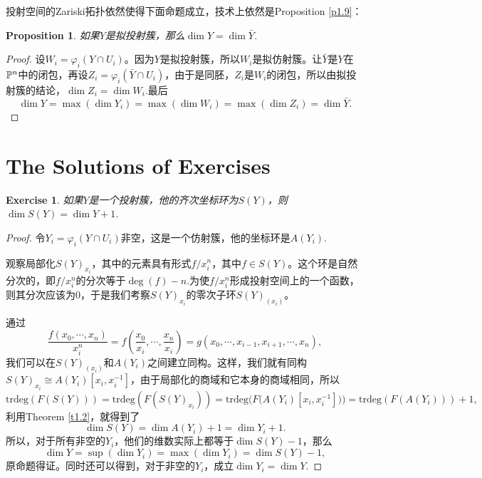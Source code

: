 \documentclass[9pt]{extbook}
\theoremstyle{plain}%
\newtheorem{pro}[defi]{Proposition}%
\newtheorem{exe}{Exercise}[section]%
\begin{document}
投射空间的Zariski拓扑依然使得下面命题成立，技术上依然是Proposition \ref{p1.9}：
\begin{pro}如果$Y$是拟投射簇，那么$\dim Y=\dim \bar{Y}$.\end{pro}
\begin{proof}
设$W_i=\varphi_i(Y\cap U_i)$。因为$Y$是拟投射簇，所以$W_i$是拟仿射簇。让$\bar{Y}$是$Y$在$\mathbb{P}^n$中的闭包，再设$Z_i=\varphi_i(\bar{Y}\cap U_i)$，由于是同胚，$Z_i$是$W_i$的闭包，所以由拟投射簇的结论，$\dim Z_i=\dim W_i$.最后
\[
	\dim Y=\max(\dim Y_i)=\max(\dim W_i)=\max(\dim Z_i)=\dim \bar{Y}.
\]
\end{proof}

\section*{The Solutions of Exercises}
\setcounter{exe}{5}
\begin{exe}
	如果$Y$是一个投射簇，他的齐次坐标环为$S(Y)$，则$\dim S(Y)=\dim Y+1$.
	\label{c2:e6}
\end{exe}
\begin{proof}
	令$Y_i=\varphi_i(Y\cap U_i)$非空，这是一个仿射簇，他的坐标环是$A(Y_i)$.

	观察局部化$S(Y)_{x_i}$，其中的元素具有形式$f/x_i^n$，其中$f\in S(Y)$。这个环是自然分次的，即$f/x_i^n$的分次等于$\deg(f)-n$.为使$f/x_i^n$形成投射空间上的一个函数，则其分次应该为$0$，于是我们考察$S(Y)_{x_i}$的零次子环$S(Y)_{(x_i)}$。

	通过
	\[
		\frac{f(x_0,\cdots,x_n)}{x_i^n}=f\left(\frac{x_0}{x_i},\cdots,\frac{x_n}{x_i}\right)=g(x_0,\cdots,x_{i-1},x_{i+1},\cdots,x_n),
	\]
	我们可以在$S(Y)_{(x_i)}$和$A(Y_i)$之间建立同构。这样，我们就有同构$S(Y)_{x_i}\cong A(Y_i)[x_i,x_i^{-1}]$，由于局部化的商域和它本身的商域相同，所以
	\[
	\mathrm{trdeg}(F(S(Y)))=\mathrm{trdeg}(F(S(Y)_{x_i}))=\mathrm{trdeg}\bigl(F\bigl(A(Y_i)[x_i,x_i^{-1}]\bigr)\bigr)=\mathrm{trdeg}(F(A(Y_i)))+1,
	\]
	利用Theorem \ref{t1.2}，就得到了
	\[
		\dim S(Y)=\dim A(Y_i)+1=\dim Y_i+1.
	\]
	所以，对于所有非空的$Y_i$，他们的维数实际上都等于$\dim S(Y)-1$，那么
	\[
		\dim Y=\sup (\dim Y_i)=\max (\dim Y_i)=\dim S(Y)-1,
	\]
	原命题得证。同时还可以得到，对于非空的$Y_i$，成立$\dim Y_i=\dim Y$.
\end{proof}
\end{document}
